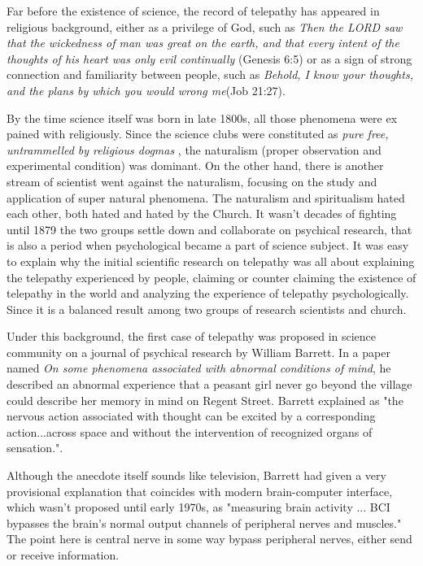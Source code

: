 \documentclass[a4paper]{article}
\begin{document}
Far before the existence of science, the record of telepathy has appeared in religious background, either as a privilege of God, such as \textit{Then the LORD saw that the wickedness of man was great on the earth, and that every intent of the thoughts of his heart was only evil continually} (Genesis 6:5) or as a sign of strong connection and familiarity between people, such as \textit{Behold, I know your thoughts, and the plans by which you would wrong me}(Job 21:27).

By the time science itself was born in late 1800s, all those phenomena were ex pained with religiously. Since the science clubs were constituted as \textit{pure free, untrammelled by religious dogmas} \autocite{feist2017religion}, the naturalism (proper observation and experimental condition) was dominant. On the other hand, there is another stream of scientist went against the naturalism, focusing on the study and application of super natural phenomena. The naturalism and spiritualism hated each other, both hated and hated by the Church. It wasn't decades of fighting until 1879 the two groups settle down and collaborate on psychical research, that is also a period when psychological became a part of science subject. It was easy to explain why the initial scientific research on telepathy was all about explaining the telepathy experienced by people, claiming or counter claiming the existence of telepathy in the world\autocite{luckhurst2002invention} and analyzing the experience of telepathy psychologically. Since it is a balanced result among two groups of research scientists and church. 

Under this background, the first case of telepathy was proposed in science community on a journal of psychical research by William Barrett\autocite{luckhurst2002invention}. In a paper named \textit{On some phenomena associated with abnormal conditions of mind}, he described an abnormal experience that a peasant girl never go beyond the village could describe her memory in mind on Regent Street. \autocite{barrett1882some} Barrett explained as "the nervous action associated with thought can be excited by a corresponding action...across space and without the intervention of recognized organs of sensation."\autocite{luckhurst2002invention}.

Although the anecdote itself sounds like television, Barrett had given a very provisional explanation that coincides with modern brain-computer interface, which wasn't proposed until early 1970s, as "measuring brain activity ... BCI bypasses the brain’s normal output channels of peripheral nerves and muscles."\autocite{zander2014towards} The point here is central nerve in some way bypass peripheral nerves, either send or receive information. 
\end{document}
